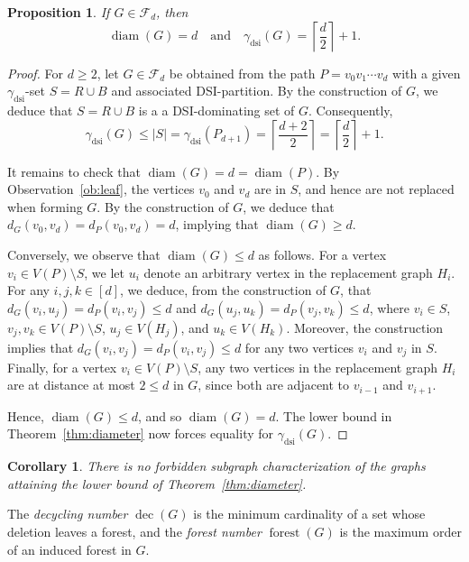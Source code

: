 \documentclass[11pt]{article}
\newtheorem{proposition}[theorem]{Proposition}
\newtheorem{corollary}[theorem]{Corollary}
\theoremstyle{definition}
\theoremstyle{remark}
\newcommand{\cF}{{\mathcal{F}}}
\newcommand{\dsi}{\mathrm{dsi}}
\newcommand{\diam}{\operatorname{diam}}
\newcommand{\dec}{\operatorname{dec}}
\newcommand{\forest}{\operatorname{forest}}
\begin{document}
\begin{proposition}
\label{prop:diameter-path-blowups}
If $G \in \cF_d$, then  
\[
   \diam(G)=d
   \quad\text{and}\quad
   \gamma_{\dsi}(G)=\left\lceil \frac d2\right\rceil+1.
\]
\end{proposition}
\begin{proof}  For $d \ge 2$, let \(G \in \cF_d\) be obtained from the  path \(P=v_0v_1\cdots v_d\)  with a given  $\gamma_{\dsi}$-set  $S= R \cup B$ and  associated 
DSI-partition.  By the construction of \(G\), we deduce that $S = R \cup B$ is a 
a DSI-dominating set of \(G\). Consequently,
\[
   \gamma_{\dsi}(G)\le |S|=\gamma_{\dsi}(P_{d+1})
      =\left\lceil\frac{d+2}{2}\right\rceil
      =\left\lceil\frac d2\right\rceil+1.
\]

It remains to check that \(\diam(G) = d = \diam(P)\).  By Observation~\ref{ob:leaf}, the vertices \(v_0\) and \(v_d\) are in  \(S\), and hence are not replaced  when forming  \(G\).  By the construction of \(G\), we deduce that \(d_G(v_0,v_d) = d_P(v_0,v_d) = d\), implying that \(\diam(G)\ge d\).

Conversely, we observe that $\diam(G) \le d$ as follows.  For a vertex $v_i \in V(P) \setminus S$, we let $u_i$ denote an arbitrary vertex in the replacement graph $H_i$.
For any $i, j, k \in [d]$, we deduce, from the construction of $G$, that \(d_G(v_i,u_j) = d_P(v_i,v_j)  \le d\) and  \(d_G(u_j,u_k) = d_P(v_j,v_k)  \le d\), where $v_i \in S$, $v_j, v_k \in V(P) \setminus S$, $u_j \in V(H_j)$, and $u_k \in V(H_k)$.  Moreover, the construction implies that $d_G(v_i,v_j) = d_P(v_i,v_j)  \le d$  for any  two vertices \(v_i\) and \(v_j\) in \(S\). Finally, for a vertex $v_i \in V(P) \setminus S$, any  two vertices in the replacement graph \(H_i\) are at
distance at most \(2 \le d\) in $G$, since both are adjacent to \(v_{i-1}\) and
\(v_{i+1}\).  
 
 Hence, \(\diam(G)\le d\), and so
\(\diam(G)=d\). The lower bound in Theorem~\ref{thm:diameter} now forces
equality for \(\gamma_{\dsi}(G)\).
\end{proof}

\begin{corollary}  There is no forbidden subgraph characterization of the graphs attaining the lower bound of Theorem~\ref{thm:diameter}.
\end{corollary}


 The
\emph{decycling number} \(\dec(G)\) is the minimum cardinality of a set
whose deletion leaves a forest, and the \emph{forest number}
\(\forest(G)\) is the maximum order of an induced forest in \(G\).
\end{document}
